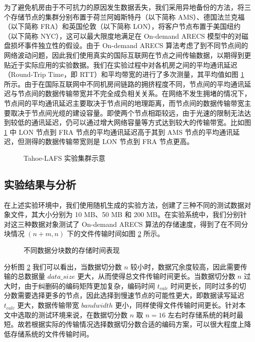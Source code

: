 为了避免机房由于不可抗力的原因发生数据丢失，我们采用异地备份的方法，将三个存储节点的集群分别布置于荷兰阿姆斯特丹（以下简称 AMS）、德国法兰克福（以下简称 FRA）和英国伦敦（以下简称 LON），将客户节点布置于美国纽约（以下简称 NYC），这可以最大限度地满足在 On-demand ARECS 模型中的对磁盘损坏事件独立性的假设。由于 On-demand ARECS 算法考虑了到不同节点间的网络波动问题，因此我们使用真实的国际互联网在节点之间传输数据，以期得到更贴近于实际应用的实验数据。我们在实验过程中对各机房之间的平均通讯延迟（Round-Trip Time，即 RTT）和平均带宽的进行了多次测量，其平均值如图 \ref{p6} 所示。由于在国际互联网中不同机房间链路的拥挤程度不同，节点间的平均通讯延迟与节点间的数据传输带宽并不完全成负相关关系。在网络不发生拥堵的情况下，节点间的平均通讯延迟主要取决于节点间的地理距离，而节点间的数据传输带宽主要取决于节点间光缆的建设容量。即使两个节点相距较远，由于光速的限制无法达到较低的通讯延迟，仍可以通过增大网络容量等方式达到较大的传输带宽。比如图 \ref{p6} 中 LON 节点到 FRA 节点的平均通讯延迟高于其到 AMS 节点的平均通讯延迟，但测得的数据传输带宽则是 LON 节点到 FRA 节点更高。

\begin{figure}[!htb]
\centering
\resizebox{.8\textwidth}{!}{}
\caption{Tahoe-LAFS 实验集群示意}
\label{p6}
\end{figure}
\subsection{实验结果与分析}
在上述实验环境中，我们使用随机生成的实验方法，创建了三种不同的测试数据对象文件，其大小分别为 10 MB、50 MB 和 200 MB。在实验系统中，我们分别针对这三种数据对象测试了 On-demand ARECS 算法的存储速度，得到了在不同分块情况 $(n+m,n)$ 下的文件传输时间如图 \ref{p7} 所示。

\begin{figure}[!htb]
\centering
\resizebox{.8\textwidth}{!}{}
\caption{不同数据分块数的存储时间表现}
\label{p7}
\end{figure}

分析图 \ref{p7} 我们可以看出，当数据切分数 $n$ 较小时，数据冗余度较高，因此需要传输的总数据量 $data\_size$ 更大，从而使得总文件传输时间更长。当数据切分数 $n$ 过大时，由于纠删码的编码矩阵更加复杂，编码时间 $t_{calc}$ 时间更长，同时过多的切分数需要选择更多的节点，因此选择到慢速节点的可能性更大，即数据读写延迟 $t_{calc}$ 更大，数据传输带宽 $bandwidth$ 更小，同样使得文件传输时间更长。针对本文中选取的测试环境来说，在数据切分数 $n$ 取 $n=16$ 左右时存储系统的耗时最短。故若根据实际的传输情况选择数据切分数合适的编码方案，可以很大程度上降低存储系统的文件传输时间。


